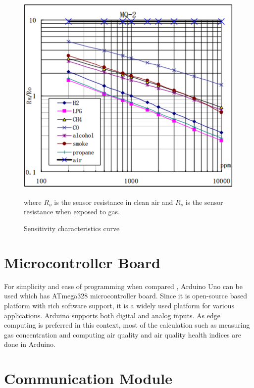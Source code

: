 \documentclass[11pt]{article}
\begin{document}
    \begin{figure}
      \begin{center}
      \includegraphics[scale=0.40]{images/figure1.png}
      \end{center}
      \caption{Sensitivity characteristics curve \cite{Data2012}}
      \label{mesh}
  
      where $R_{o}$ is the sensor resistance in clean air and $R_{s}$ is the sensor resistance when exposed to gas.
    \end{figure}
   



    
 \section* {Microcontroller Board}


 
 For simplicity and ease of programming when compared , Arduino Uno can be used which has ATmega328 microcontroller board. Since it is open-source based platform with rich software support, it is a widely used platform for various applications. Arduino supports both digital and analog inputs. As edge computing is preferred in this context, most of the calculation such as measuring gas concentration and computing air quality and air quality health indices are done in Arduino.



 \section*{Communication Module}
\end{document}
